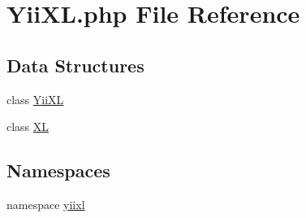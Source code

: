 \hypertarget{YiiXL_8php}{
\section{YiiXL.php File Reference}
\label{YiiXL_8php}
}
\subsection*{Data Structures}
\begin{DoxyCompactItemize}
\item 
class \hyperlink{classYiiXL}{YiiXL}
\item 
class \hyperlink{classXL}{XL}
\end{DoxyCompactItemize}
\subsection*{Namespaces}
\begin{DoxyCompactItemize}
\item 
namespace \hyperlink{namespaceyiixl}{yiixl}
\end{DoxyCompactItemize}

